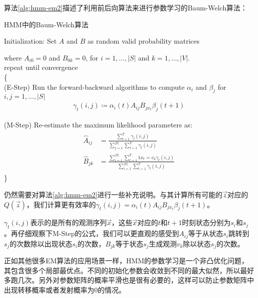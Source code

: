 算法\ref{alg:hmm-em2}描述了利用前后向算法来进行参数学习的Baum-Welch算法：
\begin{algorithm}
\caption{HMM中的Baum-Welch算法} 
\label{alg:hmm-em2}
\begin{algorithmic}[1]
Initialization: Set $A$ and $B$ as random valid probability matrices 

\quad where $A_{i0}=0$ and $B_{0k}=0$, for $i=1,...,|S|$ and $k=1,...,|V|$. \\

repeat until convergence \\
\{ \\

(E-Step) Run the forward-backward algorithms to compute $\alpha_i$ and $\beta_{j}$ for $i,j=1,...,|S|$\\
\begin{align} 
\label{eqn:gamma}
\gamma_{t}(i,j) \coloneqq \alpha_{i}(t)A_{ij}B_{jx_{t}}\beta_{j}(t+1)
\end{align}

(M-Step) Re-estimate the maximum likelihood parameters as: \\
\begin{align}
\label{eqn:hmm-a-b-answer-1}
\begin{split}
\hat{A}_{ij} &= \frac{\sum_{t=1}^{T} \gamma_{t}(i,j)}{\sum_{j=1}^{|S|}\sum_{t=1}^{T} \gamma_{t}(i,j)}\\
\hat{B}_{jk} &= \frac{\sum_{i=1}^{|S|} \sum_{t=1}^{T} 1{x_t=v_k} \gamma_{t}(i,j)}{\sum_{i=1}^{|S|} \sum_{t=1}^{T}\gamma_{t}(i,j)}
\end{split}
\end{align} 
\}
\end{algorithmic}
\end{algorithm}

仍然需要对算法\ref{alg:hmm-em2}进行一些补充说明。与其计算所有可能的$\vec{z}$对应的$Q(\vec{z})$，我们计算更有效率的$\gamma_{t}(i,j)=\alpha_{i}(t)A_{ij}B_{jx_{t}}\beta_{j}(t+1)$。

$\gamma_{t}(i,j)$表示的是所有的观测序列$\vec{x}$，这些$\vec{x}$对应的$t$和$t+1$时刻状态分别为$s_i$和$s_j$。再仔细观察下M-Step的公式，我们可以更直观的感受到$A_{ij}$等于从状态$s_i$跳转到$s_j$的次数除以出现状态$s_i$的次数，$B_{jk}$等于状态$s_j$生成观测$v_k$除以状态$s_j$的次数。

正如其他很多EM算法的应用场景一样，HMM的参数学习是一个非凸优化问题，其包含很多个局部最优点。不同的初始化参数会收敛到不同的最大似然，所以最好多跑几次。另外对参数矩阵的概率平滑也是很有必要的，这样可以防止参数矩阵中出现转移概率或者发射概率为0的情况。
